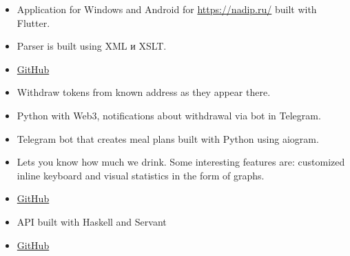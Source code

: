 \documentclass[10pt,a4paper,ragged2e]{altacv}
\begin{document}
\begin{itemize}
  \item Application for Windows and Android for \newline \url{https://nadip.ru/} built with Flutter.
\end{itemize}
\smallskip
{}
\begin{itemize}
  \item Parser is built using XML и XSLT.
  \item \href{https://github.com/YeslieSnayder/eo}{GitHub}
\end{itemize}
\smallskip
{}
\begin{itemize}
  \item Withdraw tokens from known address as they appear there.
  \item Python with Web3, notifications about withdrawal via bot in Telegram.
\end{itemize}
\smallskip
{}
\begin{itemize}
  \item Telegram bot that creates meal plans built with Python using aiogram.
\end{itemize}
\smallskip
{}
\begin{itemize}
  \item Lets you know how much we drink. Some interesting features are: customized inline keyboard and visual statistics in the form of graphs.
  \item \href{https://github.com/sl1depengwyn/drink-bot}{GitHub}
\end{itemize}
\smallskip
{}
\begin{itemize}
  \item API built with Haskell and Servant
  \item \href{https://github.com/sl1depengwyn/drink-bot-api}{GitHub}
\end{itemize}
\smallskip
{}
\end{document}

